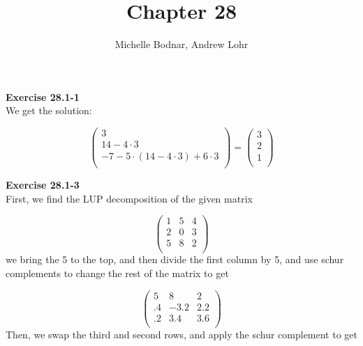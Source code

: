 \documentclass{article}
\title{Chapter 28}
\author{Michelle Bodnar, Andrew Lohr}
\begin{document}
\maketitle
\noindent\textbf{Exercise 28.1-1}\\
We get the solution:

\[
\left(
\begin{array}{c}
3\\
14 - 4\cdot3\\
-7 -5 \cdot( 14 - 4 \cdot 3) + 6\cdot 3\\
\end{array}\right) = \left(
\begin{array}{c}
3\\
2\\
1 \\
\end{array}\right)
\]



\noindent\textbf{Exercise 28.1-3}\\
First, we find the LUP decomposition of the given matrix

\[
\left(\begin{array}{ccc}
1&5&4\\
2&0&3\\
5&8&2\\
\end{array} \right)
\]
 we bring the 5 to the top, and then divide the first column by 5, and use schur complements to change the rest of the matrix to get
 
 \[
 \left(\begin{array}{ccc}
 5&8&2\\
 .4&-3.2&2.2\\
 .2&3.4&3.6\\
 \end{array}\right)
 \]
 Then, we swap the third and second rows, and apply the schur complement to get
 
\end{document}

